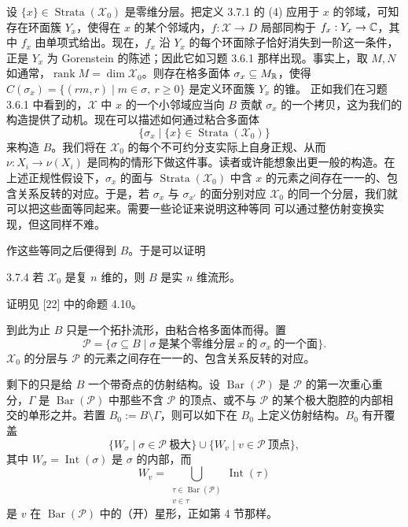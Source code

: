 设 $\{x\}\in\operatorname{Strata}(\mathcal X_0)$ 是零维分层。把定义 3.7.1 的 (4) 应用于 $x$ 的邻域，可知存在环面簇 $Y_x$，使得在 $x$ 的某个邻域内，$f:\mathcal X\to D$ 局部同构于 $f_x:Y_x\to\mathbb{C}$，其中 $f_x$ 由单项式给出。现在，$f_x$ 沿 $Y_x$ 的每个环面除子恰好消失到一阶这一条件，正是 $Y_x$ 为 Gorenstein 的陈述；因此它如习题 3.6.1 那样出现。事实上，取 $M,N$ 如通常，$\operatorname{rank}M=\dim\mathcal X_0$。则存在格多面体 $\sigma_x\subseteq M_{\mathbb{R}}$，使得 $C(\sigma_x)=\{(rm,r)\mid m\in\sigma,\ r\ge0\}$ 是定义环面簇 $Y_x$ 的锥。
正如我们在习题 3.6.1 中看到的，$\mathcal X$ 中 $x$ 的一个小邻域应当向 $B$ 贡献 $\sigma_x$ 的一个拷贝，这为我们的构造提供了动机。现在可以描述如何通过粘合多面体
\[
\{\sigma_x\mid\{x\}\in\operatorname{Strata}(\mathcal X_0)\}
\]
来构造 $B$。我们将在 $\mathcal X_0$ 的每个不可约分支实际上自身正规、从而 $\nu:X_i\to\nu(X_i)$ 是同构的情形下做这件事。读者或许能想象出更一般的构造。在上述正规性假设下，$\sigma_x$ 的面与 $\operatorname{Strata}(\mathcal X_0)$ 中含 $x$ 的元素之间存在一一的、包含关系反转的对应。于是，若 $\sigma_x$ 与 $\sigma_{x'}$ 的面分别对应 $\mathcal X_0$ 的同一个分层，我们就可以把这些面等同起来。需要一些论证来说明这种等同
可以通过整仿射变换实现，但这同样不难。

作这些等同之后便得到 $B$。于是可以证明

\begin{lemma}{3.7.4}
若 $\mathcal X_0$ 是复 $n$ 维的，则 $B$ 是实 $n$ 维流形。
\end{lemma}

证明见 [22] 中的命题 4.10。

到此为止 $B$ 只是一个拓扑流形，由粘合格多面体而得。置
\[
\mathcal P=\{\sigma\subseteq B\mid \sigma\ \text{是某个零维分层}\ x\ \text{的}\ \sigma_x\ \text{的一个面}\}.
\]
$\mathcal X_0$ 的分层与 $\mathcal P$ 的元素之间存在一一的、包含关系反转的对应。

剩下的只是给 $B$ 一个带奇点的仿射结构。设 $\operatorname{Bar}(\mathcal P)$ 是 $\mathcal P$ 的第一次重心重分，$\Gamma$ 是 $\operatorname{Bar}(\mathcal P)$ 中那些不含 $\mathcal P$ 的顶点、或不与 $\mathcal P$ 的某个极大胞腔的内部相交的单形之并。若置 $B_0:=B\setminus\Gamma$，则可以如下在 $B_0$ 上定义仿射结构。$B_0$ 有开覆盖
\[
\{W_\sigma\mid\sigma\in\mathcal P\ \text{极大}\}\cup\{W_v\mid v\in\mathcal P\ \text{顶点}\},
\]
其中 $W_\sigma=\operatorname{Int}(\sigma)$ 是 $\sigma$ 的内部，而
\[
W_v=\bigcup_{\substack{\tau\in\operatorname{Bar}(\mathcal P)\\ v\in\tau}}\operatorname{Int}(\tau)
\]
是 $v$ 在 $\operatorname{Bar}(\mathcal P)$ 中的（开）星形，正如第 4 节那样。

